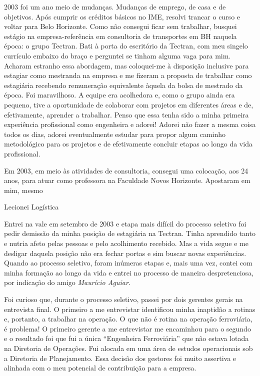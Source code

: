 \documentclass[
]{book}
\begin{document}
2003 foi um ano meio de mudanças. Mudanças de emprego, de casa e de objetivos. Após cumprir os créditos básicos no IME, resolvi trancar o curso e voltar para Belo Horizonte. Como não consegui ficar sem trabalhar, busquei estágio na empresa-referência em consultoria de transportes em BH naquela época: o grupo Tectran. Bati à porta do escritório da Tectran, com meu singelo currículo embaixo do braço e perguntei se tinham alguma vaga para mim. Acharam estranho essa abordagem, mas coloquei-me à disposição inclusive para estagiar como mestranda na empresa e me fizeram a proposta de trabalhar como estagiária recebendo remuneração equivalente àquela da bolsa de mestrado da época. Foi maravilhoso. A equipe era acolhedora e, como o grupo ainda era pequeno, tive a oportunidade de colaborar com projetos em diferentes áreas e de, efetivamente, aprender a trabalhar. Penso que essa tenha sido a minha primeira experiência profissional como engenheira e adorei! Adorei não fazer a mesma coisa todos os dias, adorei eventualmente estudar para propor algum caminho metodológico para os projetos e de efetivamente concluir etapas ao longo da vida profissional.

Em 2003, em meio às atividades de consultoria, consegui uma colocação, aos 24 anos, para atuar como professora na Faculdade Novos Horizonte. Apostaram em mim, mesmo

Lecionei Logística

Entrei na vale em setembro de 2003 e etapa mais difícil do processo seletivo foi pedir demissão da minha posição de estagiária na Tectran. Tinha aprendido tanto e nutria afeto pelas pessoas e pelo acolhimento recebido. Mas a vida segue e me desligar daquela posição não era fechar portas e sim buscar novas experiências. Quando ao processo seletivo, foram inúmeras etapas e, mais uma vez, contei com minha formação ao longo da vida e entrei no processo de maneira despretenciosa, por indicação do amigo \emph{Maurício Aguiar}.

Foi curioso que, durante o processo seletivo, passei por dois gerentes gerais na entrevista final. O primeiro a me entrevistar identificou minha inaptidão a rotinas e, portanto, a trabalhar na operação. O que não é rotina na operação ferroviária, é problema! O primeiro gerente a me entrevistar me encaminhou para o segundo e o resultado foi que fui a única ``Engenheira Ferroviária'' que não estava lotada na Diretoria de Operações. Fui alocada em uma área de estudos operacionais sob a Diretoria de Planejamento. Essa decisão dos gestores foi muito assertiva e alinhada com o meu potencial de contribuição para a empresa.
\end{document}
